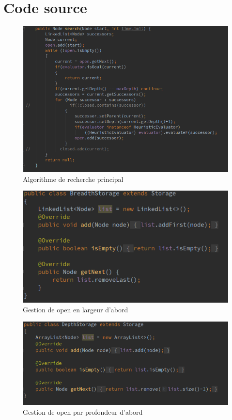 \appendix
\chapter{Code source}
\begin{figure}[H]
	\centering
	\includegraphics[width=\textwidth]{images/imgs/graphSearch.png}
	\caption{Algorithme de recherche principal}
\end{figure}

\begin{figure}[H]
	\centering
	\includegraphics[width=\textwidth]{images/imgs/BFSstorage.png}
	\caption{Gestion de open en largeur d'abord}
\end{figure}

\begin{figure}[H]
	\centering
	\includegraphics[width=\textwidth]{images/imgs/DFSStorage.png}
	\caption{Gestion de open par profondeur d'abord}
\end{figure}


